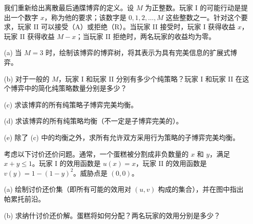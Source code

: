 \begin{exercise}\label{exer:11.3}
我们重新给出离散最后通牒博弈的定义。设 \(M\) 为正整数。玩家 I 的可能行动是提出一个数字 \(x\)，称为他的要求；该数字是 \(0,1,2,\ldots ,M\) 这些整数之一。针对这个要求，玩家 II 可以接受（A）或拒绝（R）。当玩家 II 接受时，玩家 I 获得收益 \(x\)，玩家 II 获得收益 \(M - x\)；当玩家 II 拒绝时，两名玩家的收益均为零。

(a) 当 \(M = 3\) 时，绘制该博弈的博弈树，将其表示为具有完美信息的扩展式博弈。

(b) 对于一般的 \(M\)，玩家 \(\mathrm{I}\) 和玩家 II 分别有多少个纯策略？玩家 I 和玩家 II 在这个博弈中的简化纯策略数量分别是多少？

(c) 求该博弈的所有纯策略子博弈完美均衡。

(d) 求该博弈的所有纯策略均衡（不一定是子博弈完美的）。

(e) 除了 (c) 中的均衡之外，求所有允许双方采用行为策略的子博弈完美均衡。
\end{exercise}




\begin{exercise}\label{exer:11.4}
考虑以下讨价还价问题。通常，一个蛋糕被分割成非负数量的 \(x\) 和 \(y\)，满足 \(x + y \leq  1\)。玩家 \(\mathrm{I}\) 的效用函数是 \(u\left( x\right)  = x\)，玩家 \(\mathrm{{II}}\) 的效用函数是 \(v\left( y\right)  = 1 - {\left( 1 - y\right) }^{2}\)。威胁点是 $(0,0)$。

(a) 绘制讨价还价集（即所有可能的效用对 $(u,v)$ 构成的集合），并在图中指出帕累托前沿。

(b) 求纳什讨价还价解。蛋糕将如何分配？两名玩家的效用分别是多少？
\end{exercise}


